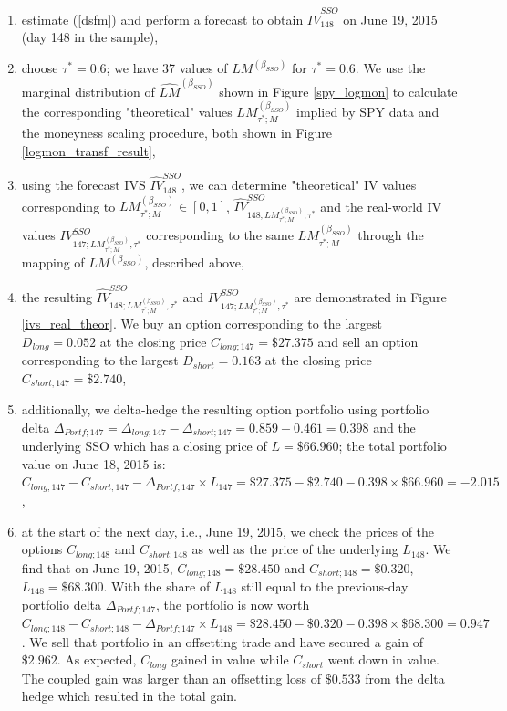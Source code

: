 \documentclass{rQUF2e}
\theoremstyle{plain}
\theoremstyle{definition}
\begin{document}
	\begin{enumerate}
		\item
		estimate (\ref{dsfm}) and perform a forecast to obtain $\widehat{IV}_{148}^{SSO}$ on June 19, 2015 (day 148 in the sample),
		\item
		choose $\tau^{*} = 0.6$; we have 37 values of $LM^{(\beta_{SSO})}$ for $\tau^{*} = 0.6$. We use the marginal distribution of $\widehat{LM}^{(\beta_{SSO})}$ shown in Figure \ref{spy_logmon} to calculate the corresponding  "theoretical" values $LM^{(\beta_{SSO})}_{ \tau^{*}; M }$ implied by SPY data and the moneyness scaling procedure, both shown in Figure \ref{logmon_transf_result},
		\item
		using the forecast IVS $\widehat{IV}_{148}^{SSO}$, we can determine "theoretical" IV values corresponding to $LM^{(\beta_{SSO})}_{ \tau^{*}; M } \in [0, 1]$, $\widehat{IV}^{SSO}_{148; LM^{(\beta_{SSO})}_{\tau^*; M}, \tau^*}$ and the real-world IV values $IV^{SSO}_{147; LM^{(\beta_{SSO})}_{\tau^*; M}, \tau^*}$ corresponding to the same $LM^{(\beta_{SSO})}_{ \tau^{*}; M }$ through the mapping of $LM^{(\beta_{SSO})}$, described above,
		\item
		the resulting $\widehat{IV}^{SSO}_{148; LM^{(\beta_{SSO})}_{\tau^*; M}, \tau^*}$ and $IV^{SSO}_{147; LM^{(\beta_{SSO})}_{\tau^*; M}, \tau^*}$ are demonstrated in Figure \ref{ivs_real_theor}. We buy an option corresponding to the largest $D_{long} = 0.052$ at the closing price $C_{long; 147} = \$27.375$ and sell an option corresponding to the largest $D_{short} = 0.163$ at the closing price $C_{short; 147} = \$2.740$,
		\item
		additionally, we delta-hedge the resulting option portfolio using portfolio delta $\Delta_{Portf; 147} = \Delta_{long; 147} - \Delta_{short; 147} = 0.859 - 0.461 = 0.398$ and the underlying SSO which has a closing price of $L = \$66.960$; the total portfolio value on June 18, 2015 is: $C_{long; 147} - C_{short; 147} - \Delta_{Portf; 147} \times L_{147} = \$27.375 - \$2.740 - 0.398 \times \$66.960 = -2.015$,
		\item
		at the start of the next day, i.e., June 19, 2015, we check the prices of the options $C_{long; 148}$ and $C_{short; 148}$ as well as the price of the underlying $L_{148}$. We find that on June 19, 2015, $C_{long; 148} = \$28.450$ and $C_{short; 148} = \$0.320$, $L_{148} = \$68.300$. With the share of $L_{148}$ still equal to the previous-day portfolio delta $\Delta_{Portf; 147}$, the portfolio is now worth $C_{long; 148} - C_{short; 148} - \Delta_{Portf; 147} \times L_{148} = \$28.450 - \$0.320 - 0.398 \times \$68.300 = 0.947$. We sell that portfolio in an offsetting trade and have secured a gain of $\$2.962$. As expected, $C_{long}$ gained in value while $C_{short}$ went down in value. The coupled gain was larger than an offsetting loss of $\$0.533$ from the delta hedge which resulted in the total gain. 
	\end{enumerate}
	
\end{document}
